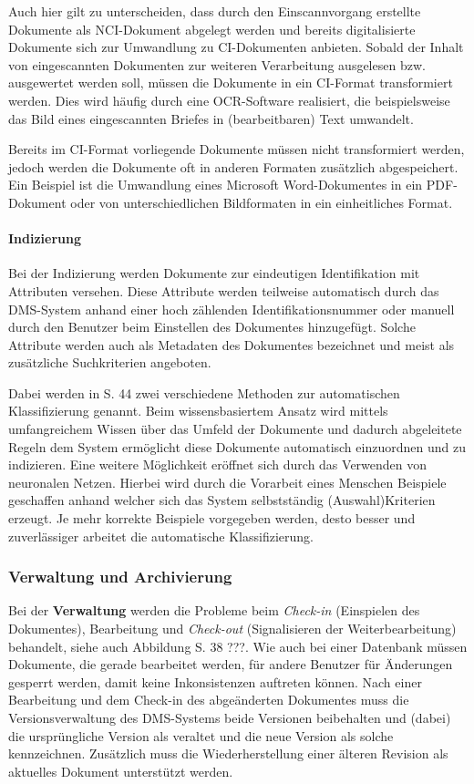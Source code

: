 Auch hier gilt zu unterscheiden, dass durch den Einscannvorgang erstellte Dokumente als \gls{NCI}-Dokument abgelegt werden und bereits digitalisierte Dokumente sich zur Umwandlung zu \gls{CI}-Dokumenten anbieten.
Sobald der Inhalt von eingescannten Dokumenten zur weiteren Verarbeitung ausgelesen bzw. ausgewertet werden soll, müssen die Dokumente in ein \gls{CI}-Format transformiert werden.
Dies wird häufig durch eine \gls{OCR}-Software realisiert, die beispielsweise das Bild eines eingescannten Briefes in (bearbeitbaren) Text umwandelt.

Bereits im \gls{CI}-Format vorliegende Dokumente müssen nicht transformiert werden, jedoch werden die Dokumente oft in anderen Formaten zusätzlich abgespeichert.
Ein Beispiel ist die Umwandlung eines Microsoft Word-Dokumentes in ein \gls{PDF}-Dokument oder von unterschiedlichen Bildformaten in ein einheitliches Format.

\paragraph{Indizierung}
Bei der Indizierung werden Dokumente zur eindeutigen Identifikation mit Attributen versehen.
Diese Attribute werden teilweise automatisch durch das \gls{DMS}-System anhand einer hoch zählenden Identifikationsnummer oder manuell durch den Benutzer beim Einstellen des Dokumentes hinzugefügt.
Solche Attribute werden auch als Metadaten des Dokumentes bezeichnet und meist als zusätzliche Suchkriterien angeboten.

Dabei werden in \cite{DMS08} S. 44 zwei verschiedene Methoden zur automatischen Klassifizierung genannt.
Beim wissensbasiertem Ansatz wird mittels umfangreichem Wissen über das Umfeld der Dokumente und dadurch abgeleitete Regeln dem System ermöglicht diese Dokumente automatisch einzuordnen und zu indizieren.
Eine weitere Möglichkeit eröffnet sich durch das Verwenden von neuronalen Netzen.
Hierbei wird durch die Vorarbeit eines Menschen Beispiele geschaffen anhand welcher sich das System selbstständig (Auswahl)Kriterien erzeugt.
Je mehr korrekte Beispiele vorgegeben werden, desto besser und zuverlässiger arbeitet die automatische Klassifizierung.

\subsubsection{Verwaltung und Archivierung}
Bei der \textbf{Verwaltung} werden die Probleme beim \textit{Check-in} (Einspielen des Dokumentes), Bearbeitung und \textit{Check-out} (Signalisieren der Weiterbearbeitung) behandelt, siehe auch Abbildung \cite{DMS08} S. 38 ???.
Wie auch bei einer Datenbank müssen Dokumente, die gerade bearbeitet werden, für andere Benutzer für Änderungen gesperrt werden, damit keine Inkonsistenzen auftreten können.
Nach einer Bearbeitung und dem Check-in des abgeänderten Dokumentes muss die Versionsverwaltung des \gls{DMS}-Systems beide Versionen beibehalten und (dabei) die ursprüngliche Version als veraltet und die neue Version als solche kennzeichnen.
Zusätzlich muss die Wiederherstellung einer älteren Revision als aktuelles Dokument unterstützt werden.


